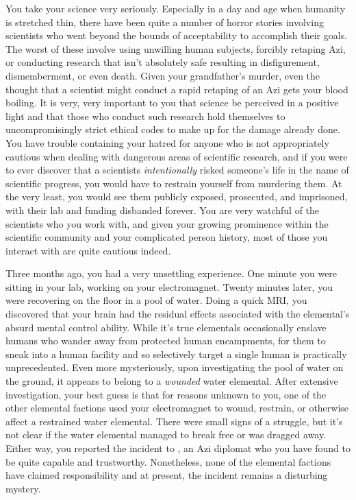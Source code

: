 \documentclass[char]{guildcamp1}
\begin{document}
You take your science very seriously. Especially in a day and age when humanity is stretched thin, there have been quite a number of horror stories involving scientists who went beyond the bounds of acceptability to accomplish their goals. The worst of these involve using unwilling human subjects, forcibly retaping Azi, or conducting research that isn't absolutely safe resulting in disfigurement, dismemberment, or even death. Given your grandfather's murder, even the thought that a scientist might conduct a rapid retaping of an Azi gets your blood boiling. It is very, very important to you that science be perceived in a positive light and that those who conduct such research hold themselves to uncompromisingly strict ethical codes to make up for the damage already done. You have trouble containing your hatred for anyone who is not appropriately cautious when dealing with dangerous areas of scientific research, and if you were to ever discover that a scientists \emph{intentionally} risked someone's life in the name of scientific progress, you would have to restrain yourself from murdering them. At the very least, you would see them publicly exposed, prosecuted, and imprisoned, with their lab and funding disbanded forever. You are very watchful of the scientists who you work with, and given your growing prominence within the scientific community and your complicated person history, most of those you interact with are quite cautious indeed.

Three months ago, you had a very unsettling experience. One minute you were sitting in your lab, working on your electromagnet. Twenty minutes later, you were recovering on the floor in a pool of water. Doing a quick MRI, you discovered that your brain had the residual effects associated with the elemental's absurd mental control ability. While it's true elementals occasionally enslave humans who wander away from protected human encampments, for them to sneak into a human facility and so selectively target a single human is practically unprecedented. Even more mysteriously, upon investigating the pool of water on the ground, it appears to belong to a \emph{wounded} water elemental. After extensive investigation, your best guess is that for reasons unknown to you, one of the other elemental factions used your electromagnet to wound, restrain, or otherwise affect a restrained water elemental. There were small signs of a struggle, but it's not clear if the water elemental managed to break free or was dragged away. Either way, you reported the incident to \cDiplomat{\intro}, an Azi diplomat who you have found to be quite capable and trustworthy. Nonetheless, none of the elemental factions have claimed responsibility and at present, the incident remains a disturbing mystery.
\end{document}
